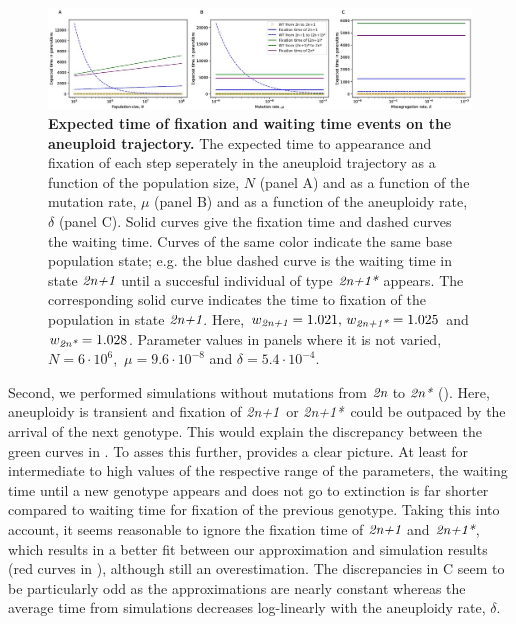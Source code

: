 \documentclass[12pt]{extarticle}
\newcommand{\euwt}{\emph{2n}}
\newcommand{\anwt}{\emph{2n+1}}
\newcommand{\eumt}{\emph{2n*}}
\newcommand{\anmt}{\emph{2n+1*}}
\begin{document}
  \begin{figure}[h!]
 \includegraphics[width=1\textwidth]{../figures/figgrid_fixT_vs_waitT.jpg}
 \caption{\textbf{Expected time of fixation and waiting time events on the aneuploid trajectory.}
  The expected time to appearance and fixation of each step seperately in the aneuploid trajectory as a function of the population size, $N$ (panel A) and as a function of the mutation rate, $\mu$ (panel B) and as a function of the aneuploidy rate, $\delta$ (panel C). Solid curves give the fixation time and dashed curves the waiting time. Curves of the same color indicate the same base population state;  e.g. the blue dashed curve is the waiting time in state $\anwt$ until a succesful individual of type $\anmt$ appears. The corresponding solid curve indicates the time to fixation of the population in state $\anwt$. Here, $w_\anwt=1.021,\,   w_\anmt=1.025$ and $w_\eumt=1.028$. Parameter values in panels where it is not varied, $N=6\cdot 10^6$,\, $\mu=9.6\cdot 10^{-8}$ and $\delta=5.4\cdot 10^{-4}$.  }
 \label{fig:fixT vs waitT}
 \end{figure}
 
Second, we performed simulations without mutations from $\euwt$ to $\eumt$ (). 
Here, aneuploidy is transient and fixation of \anwt\ or \anmt\ could be outpaced by the arrival of the next genotype. This would explain the discrepancy between the green curves in .
To asses this further,  provides a clear picture. At least for intermediate to high values of the respective range of the parameters, the waiting time until a new genotype appears and does not go to extinction is far shorter compared  to waiting time for fixation of the previous genotype. Taking this into account, it seems reasonable to ignore the fixation time of $\anwt$ and $\anmt$, which results in a better fit between our approximation and simulation results (red curves in ), although still an overestimation.
The discrepancies in C seem to be particularly odd as the approximations are nearly constant whereas the average time from simulations decreases log-linearly with the aneuploidy rate, $\delta$. 
\end{document}
